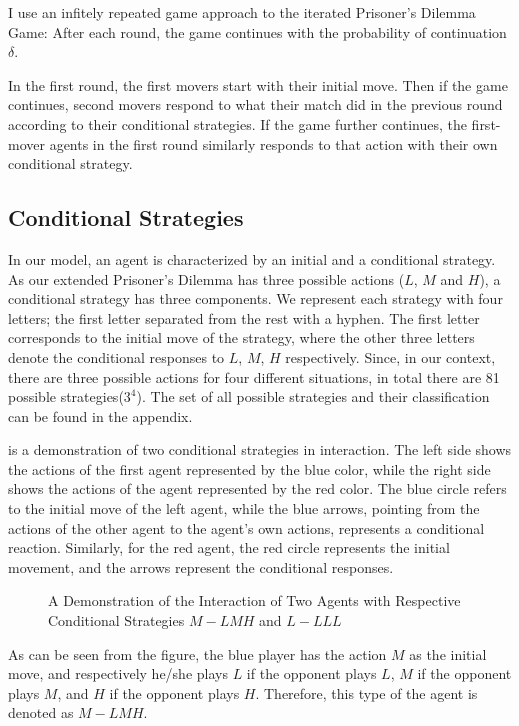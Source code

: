 \documentclass[12pt]{article}
\begin{document}
I use an infitely repeated game approach to the iterated Prisoner's Dilemma Game: After each round, the game continues with the probability of continuation $\delta$. 

In the first round, the first movers start with their initial move. Then if the game continues, second movers respond to what their match did in the previous round according to their conditional strategies. If the game further continues, the first-mover agents in the first round similarly responds to that action with their own conditional strategy. 

\subsection*{Conditional Strategies}
In our model, an agent is characterized by an initial and a conditional strategy. As our extended Prisoner's Dilemma has three possible actions ($L$, $M$ and $H$), a conditional strategy has three components. We represent each strategy with four letters; the first letter separated from the rest with a hyphen. The first letter corresponds to the initial move of the strategy, where the other three letters denote the conditional responses to $L$, $M$, $H$ respectively. Since, in our context, there are three possible actions for four different situations, in total there are 81 possible strategies($3^4$). The set of all possible strategies and their classification can be found in the appendix.

  is a demonstration of two conditional strategies in interaction. The left side shows the actions of the first agent represented by the blue color, while the right side shows the actions of the agent represented by the red color. The blue circle refers to the initial move of the left agent, while the blue arrows, pointing from the actions of the other agent to the agent's own actions, represents a conditional reaction. Similarly, for the red agent, the red circle represents the initial movement, and the arrows represent the conditional responses.

	\begin{figure}[H]
\centering

		\caption[Demonstration of Interacting Agents]{A Demonstration of the Interaction of Two Agents with Respective Conditional Strategies $M-LMH$ and $L-LLL$}
\label{fig:evo-stategies}
	\end{figure}

As can be seen from the figure, the blue player has the action $M$ as the initial move, and respectively he/she plays $L$ if the opponent plays $L$, $M$ if the opponent plays $M$, and $H$ if the opponent plays $H$. Therefore, this type of the agent is denoted as $M-LMH$. 
\end{document}
